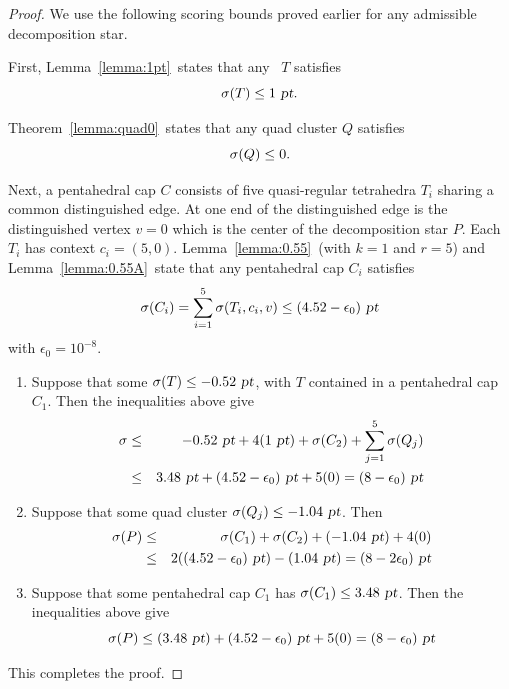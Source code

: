 \begin{proof}
We use the following scoring bounds proved earlier for any admissible decomposition star.

First, Lemma~\ref{lemma:1pt}\tomcite\ states that any \qrtet\ $T$
satisfies
    \[\operatorname{\sigma}(T) \le 1 \text{ \sl pt}. \]

Theorem~\ref{lemma:quad0}\tomcite\ states that any quad cluster $Q$
satisfies
    \[\operatorname{\sigma}(Q) \le 0.\]

Next, a pentahedral cap $C$ consists of five quasi-regular
tetrahedra $T_i$ sharing a common distinguished edge.  At one end of
the distinguished edge is the distinguished vertex $v=0$ which is
the center of the decomposition star $P$.  Each $T_i$ has context
$c_i = (5, 0)$. Lemma~\ref{lemma:0.55}\tomcite\ (with $k=1$ and
$r=5$) and Lemma~\ref{lemma:0.55A}\tomcite\ state that any
pentahedral cap $C_i$ satisfies
    \[\operatorname{\sigma}(C_i) = \sum_{i=1}^5 \operatorname{\sigma}(T_i,c_i,v) \le (4.52 - \epsilon_0) \text{ \sl pt}\]
with $\epsilon_0 = 10^{-8}$.

\begin{enumerate}
\item Suppose that some $\operatorname{\sigma}(T) \le -0.52 \text{ \sl pt}$, with $T$ contained in a pentahedral cap $C_1$.
Then the inequalities above give
\begin{eqnarray*}
\operatorname{\sigma} & \le & -0.52 \text{ \sl pt} + 4(1 \text{ \sl pt}) + \operatorname{\sigma}(C_2) + \sum_{j=1}^5\operatorname{\sigma}(Q_j)    \\
                 & \le & 3.48 \text{ \sl pt}  + (4.52 - \epsilon_0) \text{ \sl pt} + 5(0) = (8 - \epsilon_0) \text{ \sl pt}
\end{eqnarray*}

\item Suppose that some quad cluster $\operatorname{\sigma}(Q_j) \le -1.04 \text{ \sl pt}$.  Then
\begin{eqnarray*}
\operatorname{\sigma}(P) & \le & \operatorname{\sigma}(C_1) + \operatorname{\sigma}(C_2) + (-1.04 \text{ \sl pt}) + 4(0)    \\
                 & \le & 2((4.52 - \epsilon_0) \text{ \sl pt}) -(1.04 \text{ \sl pt}) = (8 - 2\epsilon_0) \text{ \sl pt}
\end{eqnarray*}
\item Suppose that some pentahedral cap $C_1$ has $\operatorname{\sigma}(C_1) \le 3.48 \text{ \sl pt}$.
Then the inequalities above give
    \[\operatorname{\sigma}(P) \le (3.48 \text{ \sl pt}) + (4.52 - \epsilon_0) \text{ \sl pt} + 5(0) = (8 - \epsilon_0) \text{ \sl pt}\]
\end{enumerate}

This completes the proof.
\end{proof}

